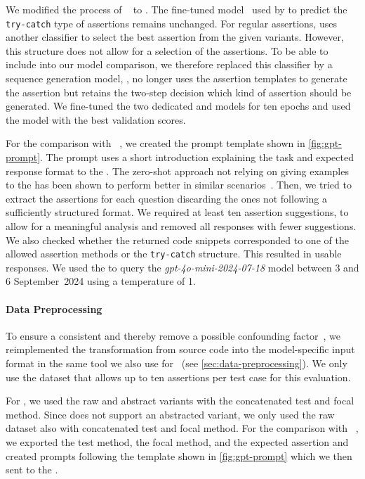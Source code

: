 We modified the process of \toga~\cite{Dinella2022} to \togaast.
The fine-tuned \bert model~\cite{Devlin2019} used by \toga to predict
the \texttt{try-catch} type of assertions remains unchanged.
For regular assertions, \toga uses another classifier to select the
best assertion from the given variants. However, this structure does
not allow for a  selection of the assertions. To be able to
include \toga into our model comparison, we therefore replaced this
\bert classifier by a \bart~\cite{Lewis2020} sequence generation
model, \ie, \togaast no longer uses the assertion templates to generate
the assertion but retains the two-step decision which kind of
assertion should be generated.
We fine-tuned the two dedicated \bert and \bart models for ten epochs
and used the model with the best validation scores.

For the comparison with \chatgpt~\cite{Brown2020}, we created the
prompt template shown in \cref{fig:gpt-prompt}. The prompt uses a
short introduction explaining the task and expected response format to
the \llm. The zero-shot approach not relying on giving examples to the
\llm has been shown to perform better in similar
scenarios~\cite{Wang2024}.
Then, we tried to extract the assertions for each question discarding
the ones not following a sufficiently structured format. We required at
least ten assertion suggestions, to allow for a meaningful 
analysis and removed all responses with fewer suggestions. We also
checked whether the returned code snippets corresponded to one of the
allowed assertion methods or the \texttt{try-catch} structure.
This resulted in  usable responses.
We used the  \api to query the
\textit{gpt-4o-mini-2024-07-18} model between 3 and 6 September~2024
using a temperature of 1.


\paragraph{Data Preprocessing}

To ensure a consistent \AST and thereby remove a possible confounding
factor~\cite{Utkin2022}, we reimplemented the transformation from
source code into the model-specific input format in the same tool we
also use for \assertfive~(see \cref{sec:data-preprocessing}).
We only use the dataset that allows up to ten assertions per test case
for this evaluation.

For \atlas, we used the raw and abstract variants with the
concatenated test and focal method.
Since \doprebart does not support an abstracted variant, we only used
the raw dataset also with concatenated test and focal method.
For the comparison with \chatgpt~\cite{Brown2020}, we exported the
test method, the focal method, and the expected assertion and created
prompts following the template shown in \cref{fig:gpt-prompt} which we
then sent to the  \api.

